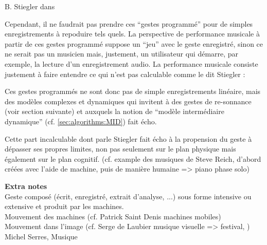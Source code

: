  B. Stiegler dans \cite{stiegler_circuit_2004}

Cependant, il ne faudrait pas prendre ces ``gestes programmé'' pour de simples enregistrements à repoduire tels quels. La perspective de performance musicale à partir de ces gestes programmé suppose un ``jeu'' avec le geste enregistré, sinon ce ne serait pas un musicien mais, justement, un utilisateur qui démarre, par exemple, la lecture d'un enregistrement audio. La performance musicale consiste justement à faire entendre ce qui n'est pas calculable comme le dit Stiegler \cite{stiegler_circuit_2004}:
 

 Ces gestes programmés ne sont donc pas de simple enregistrements linéaire, mais des modèles complexes et dynamiques qui invitent à des gestes de re-sonnance (voir section suivante) et auxquels la notion de ``modèle intermédiaire dynamique'' (cf. \ref{sec:algorithms:MID}) fait écho.

 Cette part incalculable dont parle Stiegler fait écho à la propension du geste à dépasser ses propres limites, non pas seulement sur le plan physique mais également sur le plan cognitif. (cf. example des musiques de Steve Reich, d'abord créées avec l'aide de machine, puis de manière humaine => piano phase solo)

\textbf{Extra notes}\\

Geste composé (écrit, enregistré, extrait d'analyse, ...) sous forme intensive ou extensive et produit par les machines.\\
Mouvement des machines (cf. Patrick Saint Denis machines mobiles)\\
Mouvement dans l'image (cf. Serge de Laubier musique visuelle => festival, )\\
 Michel Serres, Musique


